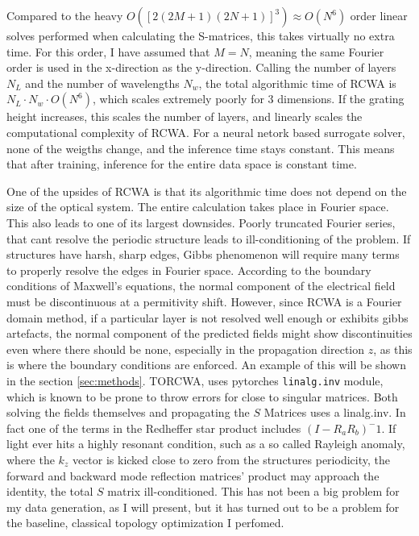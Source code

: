 Compared to the heavy $O([2(2M+1)(2N+1)]^3) \approx O(N^6)$ order linear solves performed when calculating the S-matrices, this takes virtually no extra time. For this order, I have assumed that $M=N$, meaning the same Fourier order is used in the x-direction as the y-direction.
Calling the number of layers $N_L$ and the number of wavelengths $N_w$, the total algorithmic time of RCWA is $N_L \cdot N_w \cdot O(N^6)$, which scales extremely poorly for 3 dimensions. If the grating height increases, this scales the number of layers, and linearly scales the computational complexity of RCWA. For a neural netork based surrogate solver, none of the weigths change, and the inference time stays constant.
This means that after training, inference for the entire data space is constant time.

One of the upsides of RCWA is that its algorithmic time does not depend on the size of the optical system. The entire calculation takes place in Fourier space.
This also leads to one of its largest downsides. Poorly truncated Fourier series, that cant resolve the periodic structure leads to ill-conditioning of the problem. If structures have harsh, sharp edges, Gibbs phenomenon will require many terms to properly resolve the edges in Fourier space.
According to the boundary conditions of Maxwell's equations, the normal component of the electrical field must be discontinuous at a permitivity shift. However, since RCWA is a Fourier domain method, if a particular layer is not resolved well enough or exhibits gibbs artefacts, the normal component of the predicted fields might show discontinuities even where there should be none, especially in the propagation direction $z$, as this is where the boundary conditions are enforced.
An example of this will be shown in the section \ref{sec:methods}. TORCWA, uses pytorches \texttt{linalg.inv} module, which is known to be prone to throw errors for close to singular matrices.
Both solving the fields themselves and propagating the $S$ Matrices uses a linalg.inv. In fact one of the terms in the Redheffer star product includes $(I - R_a R_b)^-1$. If light ever hits a highly resonant condition, such as a so called Rayleigh anomaly, where the $k_z$ vector is kicked close to zero from the structures periodicity, the forward and backward mode reflection matrices' product may approach the identity, the total $S$ matrix ill-conditioned. This has not been a big problem for my data generation, as I will present, but it has turned out to be a problem for the baseline, classical topology optimization I perfomed.


